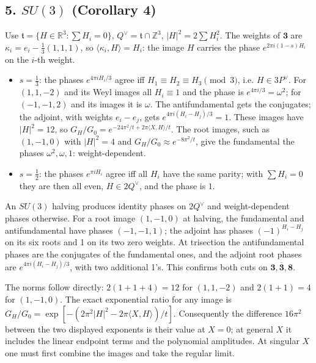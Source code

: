 \documentclass[11pt,a4paper]{article}
\newcommand{\tightlist}{\setlength{\itemsep}{0pt}\setlength{\parskip}{0pt}}
\begin{document}
\hypertarget{su3-corollary-4}{%
\subsection{\texorpdfstring{5. \(SU(3)\) (Corollary
4)}{5. SU(3) (Corollary 4)}}\label{su3-corollary-4}}

Use \(\mathfrak t=\{H\in\mathbb R^3:\sum H_i=0\}\),
\(Q^\vee=\mathfrak t\cap\mathbb Z^3\), \(|H|^2=2\sum H_i^2\). The
weights of \(\mathbf3\) are \(\kappa_i=e_i-\frac13(1,1,1)\), so
\(\langle\kappa_i,H\rangle=H_i\): the image \(H\) carries the phase
\(e^{2\pi i(1-s)H_i}\) on the \(i\)-th weight.

\begin{itemize}
\tightlist
\item
  \(s=\frac13\): the phases \(e^{4\pi iH_i/3}\) agree iff
  \(H_1\equiv H_2\equiv H_3\pmod3\), i.e. \(H\in3P^\vee\). For
  \((1,1,-2)\) and its Weyl images all \(H_i\equiv1\) and the phase is
  \(e^{4\pi i/3}=\omega^2\); for \((-1,-1,2)\) and its images it is
  \(\omega\). The antifundamental gets the conjugates; the adjoint, with
  weights \(e_i-e_j\), gets \(e^{4\pi i(H_i-H_j)/3}=1\). These images
  have \(|H|^2=12\), so
  \(G_H/G_0=e^{-24\pi^2/t+2\pi\langle X,H\rangle/t}\). The root images,
  such as \((1,-1,0)\) with \(|H|^2=4\) and
  \(G_H/G_0\approx e^{-8\pi^2/t}\), give the fundamental the phases
  \(\omega^2,\omega,1\): weight-dependent.
\item
  \(s=\frac12\): the phases \(e^{\pi iH_i}\) agree iff all \(H_i\) have
  the same parity; with \(\sum H_i=0\) they are then all even,
  \(H\in2Q^\vee\), and the phase is \(1\).
\end{itemize}

An \(SU(3)\) halving produces identity phases on \(2Q^\vee\) and
weight-dependent phases otherwise. For a root image \((1,-1,0)\) at
halving, the fundamental and antifundamental have phases \((-1,-1,1)\);
the adjoint has phases \((-1)^{H_i-H_j}\) on its six roots and 1 on its
two zero weights. At trisection the antifundamental phases are the
conjugates of the fundamental ones, and the adjoint root phases are
\(e^{4\pi i(H_i-H_j)/3}\), with two additional 1's. This confirms both
cuts on \(\mathbf3,\overline{\mathbf3},\mathbf8\).

The norms follow directly: \(2(1+1+4)=12\) for \((1,1,-2)\) and
\(2(1+1)=4\) for \((1,-1,0)\). The exact exponential ratio for any image
is \(G_H/G_0=\exp[-(2\pi^2|H|^2-2\pi\langle X,H\rangle)/t]\).
Consequently the difference \(16\pi^2\) between the two displayed
exponents is their value at \(X=0\); at general \(X\) it includes the
linear endpoint terms and the polynomial amplitudes. At singular \(X\)
one must first combine the images and take the regular limit.
\end{document}
